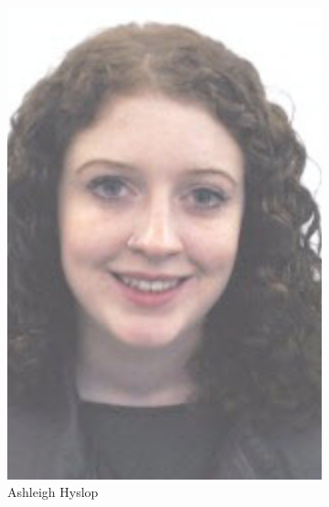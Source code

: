 \begin{figure}
\begin{subfigure}[b]{0.45\textwidth}
        \includegraphics[height=0.3\textheight]{Files/AH}
        \caption{Ashleigh Hyslop}
    \end{subfigure}
    ~~~~
    \begin{subfigure}[b]{0.45\textwidth}
        \centering

\end{subfigure}
\end{figure}
